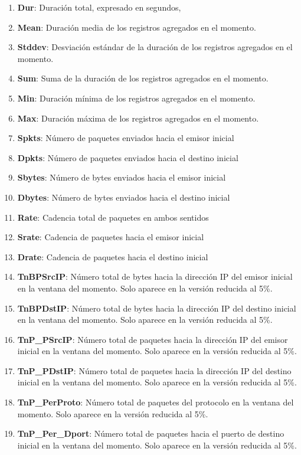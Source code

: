 \begin{enumerate}
    \item \textbf{Dur}: Duración total, expresado en segundos,
    \item \textbf{Mean}: Duración media de los registros agregados en el momento.
    \item \textbf{Stddev}: Desviación estándar de la duración de los registros agregados en el momento.
    \item \textbf{Sum}: Suma de la duración de los registros agregados en el momento.
    \item \textbf{Min}: Duración mínima de los registros agregados en el momento.
    \item \textbf{Max}: Duración máxima de los registros agregados en el momento.
    \item \textbf{Spkts}: Número de paquetes enviados hacia el emisor inicial
    \item \textbf{Dpkts}: Número de paquetes enviados hacia el destino inicial
    \item \textbf{Sbytes}: Número de bytes enviados hacia el emisor inicial
    \item \textbf{Dbytes}: Número de bytes enviados hacia el destino inicial
    \item \textbf{Rate}: Cadencia total de paquetes en ambos sentidos
    \item \textbf{Srate}: Cadencia de paquetes hacia el emisor inicial
    \item \textbf{Drate}: Cadencia de paquetes hacia el destino inicial
    \item \textbf{TnBPSrcIP}: Número total de bytes hacia la dirección IP del emisor inicial en la ventana del momento. Solo aparece en la versión reducida al 5\%.
    \item \textbf{TnBPDstIP}: Número total de bytes hacia la dirección IP del destino inicial en la ventana del momento. Solo aparece en la versión reducida al 5\%.
    \item \textbf{TnP\_PSrcIP}: Número total de paquetes hacia la dirección IP del emisor inicial en la ventana del momento. Solo aparece en la versión reducida al 5\%.
    \item \textbf{TnP\_PDstIP}: Número total de paquetes hacia la dirección IP del destino inicial en la ventana del momento. Solo aparece en la versión reducida al 5\%.
    \item \textbf{TnP\_PerProto}: Número total de paquetes del protocolo en la ventana del momento. Solo aparece en la versión reducida al 5\%.
    \item \textbf{TnP\_Per\_Dport}: Número total de paquetes hacia el puerto de destino inicial en la ventana del momento. Solo aparece en la versión reducida al 5\%.

\end{enumerate}
